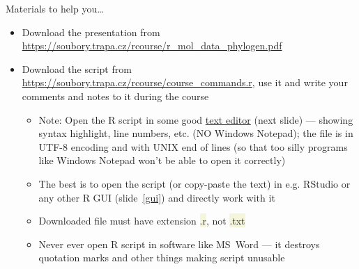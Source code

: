\documentclass[compress, xelatex, 11pt, xcolor=svgnames, aspectratio=169, url={hyphens, lowtilde}]{beamer}
\renewcommand{\texttt}[1]{\colorbox{Beige}{{\ttfamily #1}}}
\begin{document}
\begin{frame}{Materials to help you\ldots}
	\begin{itemize}
		\item Download the presentation from \url{https://soubory.trapa.cz/rcourse/r_mol_data_phylogen.pdf}
		\item Download the script from \url{https://soubory.trapa.cz/rcourse/course_commands.r}, use it and write your comments and notes to it during the course
		\begin{itemize}
			\item \alert{Note:} Open the R script in some \alert{good} \href{https://texteditors.org/cgi-bin/wiki.pl?PickingATextEditor}{text editor} (next slide) --- showing syntax highlight, line numbers, etc. (\alert{NO} Windows Notepad); the file is in UTF-8 encoding and with UNIX end of lines (so that too silly programs like Windows Notepad won't be able to open it correctly)
			\item The best is to open the script (or copy-paste the text) in e.g. RStudio or any other R GUI (slide~\ref{gui}) and directly work with it
			\item \alert{Downloaded file must have extension \texttt{*.r}, not \texttt{*.txt}}
			\item \alert{Never ever} open R script in software like MS~Word --- it destroys quotation marks and other things making script unusable
		\end{itemize}
	\end{itemize}
\end{frame}
\end{document}
